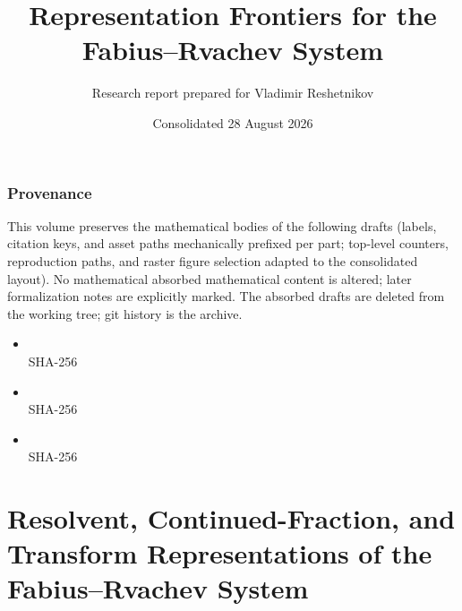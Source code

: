 \documentclass[11pt]{article}
\title{\bfseries Representation Frontiers for the Fabius--Rvachev System}
\author{Research report prepared for Vladimir Reshetnikov}
\date{Consolidated 28 August 2026}
\theoremstyle{definition}
\theoremstyle{remark}
\begin{document}
\maketitle
\tableofcontents
\clearpage
\section*{Provenance}
This volume preserves the mathematical bodies of the following drafts (labels, citation
keys, and asset paths mechanically prefixed per part; top-level counters, reproduction
paths, and raster figure selection adapted to the consolidated layout).  No mathematical
absorbed mathematical content is altered; later formalization notes are explicitly marked.
The absorbed drafts are deleted from the working tree; git history is the archive.
\begin{itemize}
\item {} \\ {\footnotesize SHA-256 }
\item {} \\ {\footnotesize SHA-256 }
\item {} \\ {\footnotesize SHA-256 }
\end{itemize}
\clearpage
\part{Resolvent, Continued-Fraction, and Transform Representations of the Fabius--Rvachev System}
\end{document}
